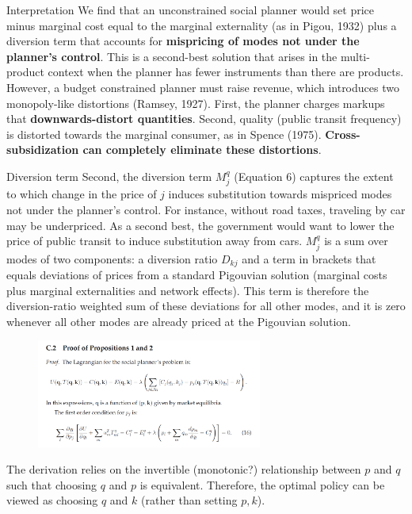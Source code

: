\documentclass[10pt, aspectratio=169]{beamer}
\begin{document}
\begin{frame}{Interpretation}
  We find that an unconstrained social planner would set \alert{price minus marginal cost} equal to the \alert{marginal externality} (as in Pigou, 1932) plus a \alert{diversion term} that accounts for \textbf{mispricing of modes not under the planner's control}. This is a second-best solution that arises in the multi-product context when the planner has fewer instruments than there are products. However, a budget constrained planner must raise revenue, which introduces two monopoly-like distortions (Ramsey, 1927). First, the planner charges \alert{markups} that \textbf{downwards-distort quantities}. Second, quality (public transit frequency) is distorted towards the marginal consumer, as in \alert{Spence} (1975). \textbf{Cross-subsidization can completely eliminate these distortions}.
\end{frame}

\begin{frame}{Diversion term}
  Second, the diversion term $M_j^q$ (Equation 6) captures the extent to which change in the price of $j$ induces substitution towards mispriced modes not under the planner's control. For instance, without road taxes, traveling by car may be underpriced. As a second best, the government would want to lower the price of public transit to induce substitution away from cars. $M_j^q$ is a sum over modes of two components: a diversion ratio $D_{kj}$ and a term in brackets that equals deviations of prices from a standard Pigouvian solution (marginal costs plus marginal externalities and network effects). This term is therefore the diversion-ratio weighted sum of these deviations for all other modes, and it is zero whenever all other modes are already priced at the Pigouvian solution.
\end{frame}

\begin{frame}
  \begin{figure}
    \centering
    \includegraphics[width=0.66\textwidth]{../Figures/proposition1_proof.png}
  \end{figure}
  The derivation relies on the invertible (monotonic?) relationship between $p$ and $q$ such that choosing $q$ and $p$ is equivalent. Therefore, the optimal policy can be viewed as choosing $q$ and $k$ (rather than setting $p, k$).
\end{frame}
\end{document}
